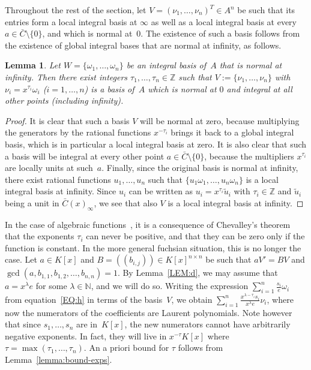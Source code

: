 \documentclass[final,1p,times,authoryear]{elsarticle}
\newtheorem{lemma}[theorem]{Lemma}
\let\set\mathbb
\begin{document}
Throughout the rest of the section, let $V = (\nu_1, \ldots, \nu_n)^T\in A^n$ be such that its entries
form a local integral basis at $\infty$ as well as a local integral basis at every $a\in\bar C\setminus\{0\}$,
and which is normal at~$0$.
The existence of such a basis follows from the existence of global integral bases that are normal at infinity,
as follows.

\begin{lemma}\label{LM:CB}
Let $W =\{\omega_1, \ldots, \omega_n\}$ be an integral basis of~$A$ that is normal at infinity. Then
there exist integers $\tau_1, \ldots, \tau_n\in\set Z$ such that
$V := \{\nu_1, \ldots, \nu_n\}$ with $\nu_i = x^{\tau_i} \omega_i$ ($i=1,\dots,n$)
is a basis of~$A$ which is normal at $0$ and integral at all other points (including infinity).
\end{lemma}
\begin{proof}
It is clear that such a basis $V$ will be normal at zero, because multiplying the generators by
the rational functions $x^{-\tau_i}$ brings it back to a global integral basis, which is in particular
a local integral basis at zero.
It is also clear that such a basis will be integral at every other point $a\in\bar C\setminus\{0\}$, because the
multipliers $x^{\tau_i}$ are locally units at such~$a$.
Finally, since the original basis is normal at infinity, there exist rational functions $u_1,\dots,u_n$
such that $\{u_1\omega_1,\dots,u_n\omega_n\}$ is a local integral basis at infinity.
Since $u_i$ can be written as $u_i=x^{\tau_i}\tilde{u}_i$ with $\tau_i\in\set Z$ and $\tilde{u}_i$ being a unit
in $\bar{C}(x)_\infty$, we see that also $V$ is a local integral basis at infinity.
\end{proof}

In the case of algebraic functions~\citep{chen16}, it is a consequence of Chevalley's theorem that the exponents
$\tau_i$ can never be positive, and that they can be zero only if the function is constant.
In the more general fuchsian situation, this is no longer the case. 
Let $a\in K[x]$ and $B = ((b_{i, j}))\in K[x]^{n \times n}$ be such that $aV'=BV$ and
$\gcd(a, b_{1, 1}, b_{1, 2}, \ldots, b_{n ,n})=1$. By Lemma~\ref{LEM:d}, we may assume that
$a=x^\lambda e$ for some $\lambda\in\set N$, and we will do so. Writing the expression
$\sum_{i=1}^n\frac{s_i}{e}\omega_i$ from equation~\eqref{EQ:h} in terms of the basis~$V$,
we obtain $\sum_{i=1}^n\frac{x^{\lambda-\tau_i}s_i}{x^\lambda e}\nu_i$, where now
the numerators of the coefficients are Laurent polynomials. Note however that since
$s_1,\dots,s_n$ are in~$K[x]$, the new numerators cannot have arbitrarily negative exponents.
In fact, they will live in $x^{-\tau}K[x]$ where $\tau=\max(\tau_1,\dots,\tau_n)$.
An a priori bound for $\tau$ follows from Lemma~\ref{lemma:bound-exps}.
\end{document}
